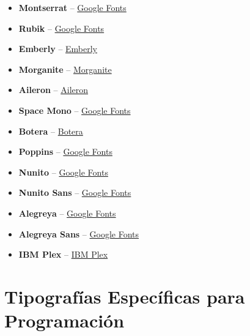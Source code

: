 \documentclass[
  jou,
  floatsintext,
  longtable,
  a4paper,
  nolmodern,
  notxfonts,
  notimes,
  12pt,
  colorlinks=true,linkcolor=blue,citecolor=blue,urlcolor=blue]{apa7}
\providecommand{\tightlist}{%
  \setlength{\itemsep}{0pt}\setlength{\parskip}{0pt}}
\begin{document}
\begin{itemize}
\tightlist
\item
  \textbf{Montserrat} --
  \href{https://fonts.google.com/specimen/Montserrat}{Google Fonts}\\
\item
  \textbf{Rubik} --
  \href{https://fonts.google.com/specimen/Rubik}{Google Fonts}\\
\item
  \textbf{Emberly} -- \href{https://bit.ly/3jgtfLD}{Emberly}\\
\item
  \textbf{Morganite} -- \href{https://bit.ly/37m7Y0P}{Morganite}\\
\item
  \textbf{Aileron} -- \href{http://dotcolon.net/font/aileron}{Aileron}\\
\item
  \textbf{Space Mono} --
  \href{https://fonts.google.com/specimen/Space}{Google Fonts}\\
\item
  \textbf{Botera} -- \href{http://javimontoya.es/botera.html}{Botera}\\
\item
  \textbf{Poppins} --
  \href{https://fonts.google.com/specimen/Poppins}{Google Fonts}\\
\item
  \textbf{Nunito} --
  \href{https://fonts.google.com/specimen/Nunito}{Google Fonts}\\
\item
  \textbf{Nunito Sans} --
  \href{https://fonts.google.com/specimen/Nunito}{Google Fonts}\\
\item
  \textbf{Alegreya} --
  \href{https://fonts.google.com/specimen/Alegreya}{Google Fonts}\\
\item
  \textbf{Alegreya Sans} --
  \href{https://fonts.google.com/specimen/Alegreya}{Google Fonts}\\
\item
  \textbf{IBM Plex} -- \href{https://www.ibm.com/plex/}{IBM Plex}
\end{itemize}

\section{Tipografías Específicas para
Programación}\label{tipografuxedas-especuxedficas-para-programaciuxf3n}
\end{document}
